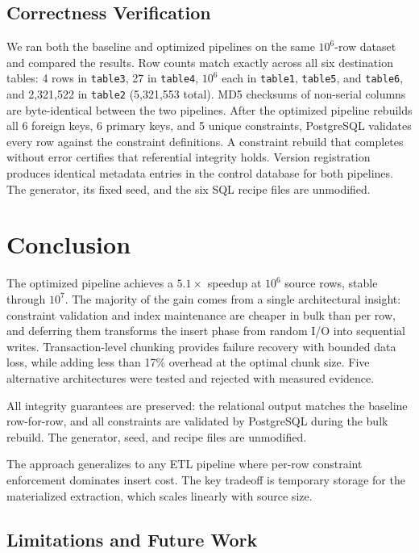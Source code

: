 \documentclass[journal]{IEEEtran}
\begin{document}
\subsection{Correctness Verification}
\label{sec:verification}

We ran both the baseline and optimized pipelines on the same $10^6$-row dataset and compared the results.
Row counts match exactly across all six destination tables: 4 rows in \texttt{table3}, 27 in \texttt{table4}, $10^6$ each in \texttt{table1}, \texttt{table5}, and \texttt{table6}, and 2,321,522 in \texttt{table2} (5,321,553 total).
MD5 checksums of non-serial columns are byte-identical between the two pipelines.
After the optimized pipeline rebuilds all 6 foreign keys, 6 primary keys, and 5 unique constraints, PostgreSQL validates every row against the constraint definitions.
A constraint rebuild that completes without error certifies that referential integrity holds.
Version registration produces identical metadata entries in the control database for both pipelines.
The generator, its fixed seed, and the six SQL recipe files are unmodified.

\section{Conclusion}
\label{sec:conclusion}

The optimized pipeline achieves a $5.1\times$ speedup at $10^6$ source rows, stable through $10^7$.
The majority of the gain comes from a single architectural insight: constraint validation and index maintenance are cheaper in bulk than per row, and deferring them transforms the insert phase from random I/O into sequential writes.
Transaction-level chunking provides failure recovery with bounded data loss, while adding less than 17\% overhead at the optimal chunk size.
Five alternative architectures were tested and rejected with measured evidence.

All integrity guarantees are preserved: the relational output matches the baseline row-for-row, and all constraints are validated by PostgreSQL during the bulk rebuild.
The generator, seed, and recipe files are unmodified.

The approach generalizes to any ETL pipeline where per-row constraint enforcement dominates insert cost.
The key tradeoff is temporary storage for the materialized extraction, which scales linearly with source size.

\subsection*{Limitations and Future Work}
\end{document}
